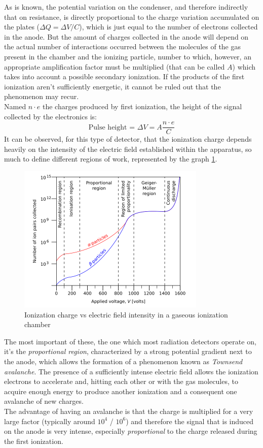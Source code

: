 \documentclass[a4paper,11pt]{book}
\begin{document}
As is known, the potential variation on the condenser, and therefore indirectly that on resistance, is directly proportional to the charge variation accumulated on the plates ($\Delta Q = \Delta V/C$), which is just equal to the number of electrons collected in the anode. But the amount of charges collected in the anode will depend on the actual number of interactions occurred between the molecules of the gas present in the chamber and the ionizing particle, number to which, however, an appropriate amplification factor must be multiplied (that can be called $A$) which takes into account a possible secondary ionization. If the products of the first ionization aren't sufficiently energetic, it cannot be ruled out that the phenomenon may recur.\\
Named $n\cdot e$ the charges produced by first ionization, the height of the signal collected by the electronics is:
\[ \text{Pulse height = } \Delta V = A\frac{n\cdot e}{C} \]
It can be observed, for this type of detector, that the ionization charge depends heavily on the intensity of the electric field established within the apparatus, so much to define different regions of work, represented by the graph \ref{fig:ion_ch_work_regions}.\\

\begin{figure}[hbtp]
\centering
\includegraphics[scale=1.5]{pictures/work_region_det.pdf}
\caption{Ionization charge vs electric field intensity in a gaseous ionization chamber}
\label{fig:ion_ch_work_regions}
\end{figure}

The most important of these, the one which most radiation detectors operate on, it's the \textit{proportional region}, characterized by a strong potential gradient next to the anode, which allows the formation of a phenomenon known as \textit{Townsend avalanche}. The presence of a sufficiently intense electric field allows the ionization electrons to accelerate and, hitting each other or with the gas molecules, to acquire enough energy to produce another ionization and a consequent one avalanche of new charges.\\
The advantage of having an avalanche is that the charge is multiplied for a very large factor (typically around $10^4$ / $10^6$) and therefore the signal that is induced on the anode is very intense, especially \textit{proportional} to the charge released during the first ionization.\\
\end{document}
